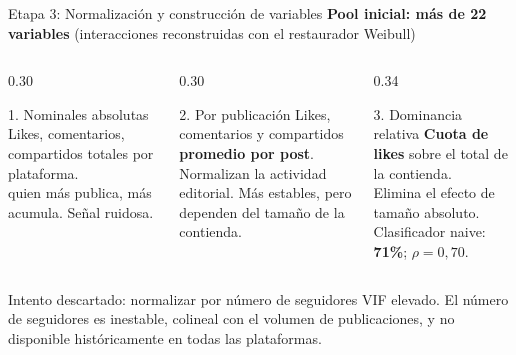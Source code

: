 \addtocounter{framenumber}{1}

\begin{frame}{Etapa 3: Normalización y construcción de variables}
  \textbf{Pool inicial: más de 22 variables}
  (interacciones reconstruidas con el restaurador Weibull)
  \vspace{0.3em}
  \begin{columns}[T]
    \begin{column}{0.30\textwidth}
      \begin{block}{\small 1. Nominales absolutas}
        \scriptsize Likes, comentarios, compartidos totales por plataforma.\\[0.3em]
         quien más publica, más acumula.
        Señal ruidosa.
      \end{block}
    \end{column}
    \begin{column}{0.30\textwidth}
      \begin{block}{\small 2. Por publicación}
        \scriptsize Likes, comentarios y compartidos \textbf{promedio por post}.\\[0.3em]
        Normalizan la actividad editorial.
        Más estables, pero dependen del tamaño de la contienda.
      \end{block}
    \end{column}
    \begin{column}{0.34\textwidth}
      \begin{exampleblock}{\small 3. Dominancia relativa \checkmark}
        \scriptsize \textbf{Cuota de likes} sobre el total de la contienda.\\[0.3em]
        Elimina el efecto de tamaño absoluto.
        Clasificador naive: \textbf{71\%}; $\rho = 0{,}70$.
      \end{exampleblock}
    \end{column}
  \end{columns}
  \vspace{0.4em}
  \begin{alertblock}{Intento descartado: normalizar por número de seguidores}
    \small VIF elevado. El número de seguidores es inestable, colineal con el volumen
    de publicaciones, y no disponible históricamente en todas las plataformas.
  \end{alertblock}
\end{frame}
